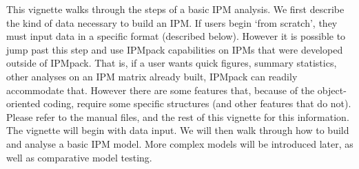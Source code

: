 \documentclass{article}
\begin{document}
This vignette walks through the steps of a basic IPM analysis.  We first
describe the kind of data necessary to build an IPM.  If users begin `from
scratch', they must input data in a specific format (described below).  However
it is possible to jump past this step and use IPMpack capabilities on IPMs that
were developed outside of IPMpack. That is, if a user wants quick figures, summary statistics, other analyses on an IPM matrix already built, IPMpack can readily accommodate that.   However there are some features that, because of the object-oriented coding, require some specific structures (and other features that do not).  Please refer to the manual files, and the rest of this vignette for this information. The vignette will begin with data input.  We will then walk through how to build and analyse a basic IPM model.  More complex models will be introduced later, as well as comparative model testing.
\end{document}
